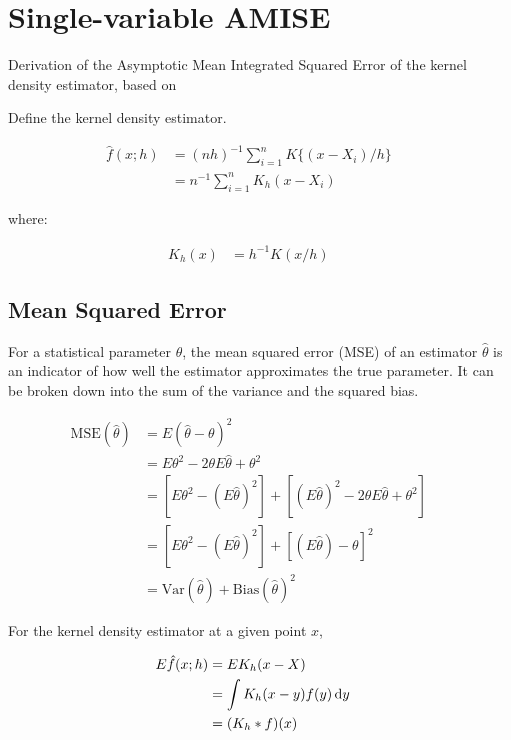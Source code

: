 
\section{Single-variable AMISE}

Derivation of the Asymptotic Mean Integrated Squared Error of the kernel density estimator, based on \citep{wand1994kernel}

Define the kernel density estimator.

\begin{align}
    \hat{f}(x;h) & = (nh)^{-1} \sum_{i=1}^{n}{K\{(x-X_i)/h\}} && \nonumber \\
        & = n^{-1} \sum_{i=1}^n{K_h(x-X_i)} && \nonumber
\end{align}

where:

\begin{align}
K_h(x) & = h^{-1} K(x/h) && \nonumber
\end{align}

\subsection{Mean Squared Error}

For a statistical parameter $\theta$, the mean squared error (MSE) of an estimator $\hat{\theta}$ is an indicator of how well the estimator approximates the true parameter.
It can be broken down into the sum of the variance and the squared bias.

\begin{align}
    \mbox{MSE}(\hat{\theta}) & =  E(\hat{\theta} - \theta)^2 && \nonumber \\
                & = E\theta^2 - 2\theta E\hat{\theta} + \theta^2 && \nonumber \\
                & = [E\theta^2 - (E\hat{\theta})^2] + [(E\hat{\theta})^2 - 2\theta E\hat{\theta} + \theta^2] && \nonumber \\
                & = [E\theta^2 - (E\hat{\theta})^2] + [(E\hat{\theta}) - \theta]^2 && \nonumber \\
                & = \mbox{Var}(\hat{\theta}) + \mbox{Bias}(\hat{\theta})^2
\end{align}

For the kernel density estimator at a given point $x$,

\begin{align}
    E\hat{f}(x;h) & = E K_h(x-X) && \nonumber \\
        & = \int{K_h(x-y)f(y)\,\mathrm{d}y} && \nonumber \\
        & = (K_h \ast f)(x) \label{eq:E_f_hat} &&
\end{align}

